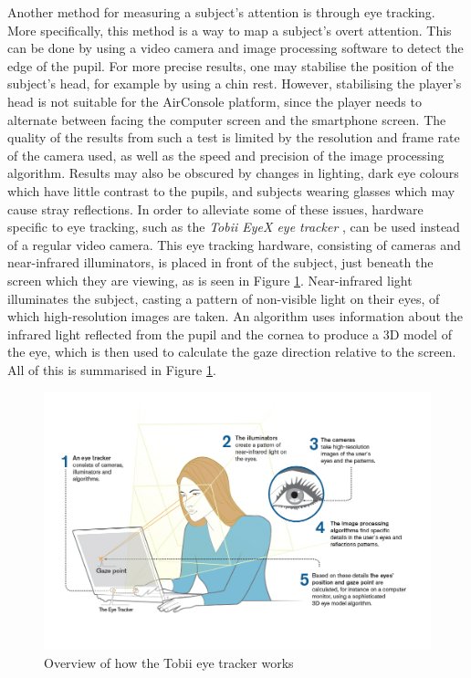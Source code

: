 Another method for measuring a subject’s attention is through eye tracking. More specifically, this method is a way to map a subject’s overt attention. This can be done by using a video camera and image processing software to detect the edge of the pupil. For more precise results, one may stabilise the position of the subject’s head, for example by using a chin rest. However, stabilising the player’s head is not suitable for the AirConsole platform, since the player needs to alternate between facing the computer screen and the smartphone screen. The quality of the results from such a test is limited by the resolution and frame rate of the camera used, as well as the speed and precision of the image processing algorithm. Results may also be obscured by changes in lighting, dark eye colours which have little contrast to the pupils, and subjects wearing glasses which may cause stray reflections. In order to alleviate some of these issues, hardware specific to eye tracking, such as the \textit{Tobii EyeX eye tracker} \cite{TobiiPro}, can be used instead of a regular video camera. This eye tracking hardware, consisting of cameras and near-infrared illuminators, is placed in front of the subject, just beneath the screen which they are viewing, as is seen in Figure \ref{fig:tobii}. Near-infrared light illuminates the subject, casting a pattern of non-visible light on their eyes, of which high-resolution images are taken. An algorithm uses information about the infrared light reflected from the pupil and the cornea to produce a 3D model of the eye, which is then used to calculate the gaze direction relative to the screen. All of this is summarised in Figure \ref{fig:tobii}.

\begin{figure}[h!]
	\centering
	\includegraphics[width=\textwidth]{figures/tobii.jpg}
	\caption{Overview of how the Tobii eye tracker works \cite{TobiiPro}\label{fig:tobii}}
\end{figure}


